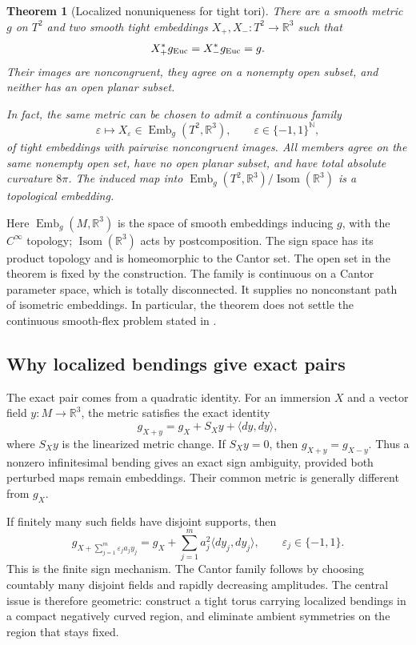 \documentclass[11pt]{amsart}
\newtheorem{theorem}{Theorem}[section]
\theoremstyle{definition}
\theoremstyle{remark}
\newcommand{\R}{\mathbb R}\newcommand{\Sph}{\mathbb S}
\DeclareMathOperator{\Isom}{Isom}\DeclareMathOperator{\Emb}{Emb}
\numberwithin{equation}{section}
\begin{document}
\begin{theorem}[Localized nonuniqueness for tight tori]\label{thm:main-fiber}
There are a smooth metric $g$ on $T^2$ and two smooth tight embeddings
$X_+,X_-:T^2\to\R^3$ such that
\[
 X_+^*g_{\rm Euc}=X_-^*g_{\rm Euc}=g.
\]
Their images are noncongruent, they agree on a nonempty open subset, and
neither has an open planar subset.

In fact, the same metric can be chosen to admit a continuous family
\[
 \varepsilon\longmapsto X_\varepsilon\in\Emb_g(T^2,\R^3),
 \qquad \varepsilon\in\{-1,1\}^{\mathbb N},
\]
of tight embeddings with pairwise noncongruent images. All members agree
on the same nonempty open set, have no open planar subset, and have total
absolute curvature $8\pi$. The induced map into
$\Emb_g(T^2,\R^3)/\Isom(\R^3)$ is a topological embedding.
\end{theorem}

Here $\Emb_g(M,\R^3)$ is the space of smooth embeddings inducing $g$, with
the $C^\infty$ topology; $\Isom(\R^3)$ acts by postcomposition. The sign
space has its product topology and is homeomorphic to the Cantor set.
The open set in the theorem is fixed by the construction. The family
is continuous on a Cantor parameter space, which is totally disconnected.
It supplies no nonconstant path of isometric embeddings. In particular,
the theorem does not settle the continuous smooth-flex problem stated
in \cite[Problem~1.1]{GhomiProblems}.

\subsection{Why localized bendings give exact pairs}
The exact pair comes from a quadratic identity. For an immersion $X$ and a vector
field $y:M\to\R^3$, the metric satisfies the exact identity
\begin{equation}\label{eq:intro-quadratic}
 g_{X+y}=g_X+S_Xy+\langle dy,dy\rangle,
\end{equation}
where $S_Xy$ is the linearized metric change. If $S_Xy=0$, then
$g_{X+y}=g_{X-y}$. Thus a nonzero infinitesimal bending gives an exact
sign ambiguity, provided both perturbed maps remain embeddings. Their
common metric is generally different from $g_X$.

If finitely many such fields have disjoint supports, then
\[
 g_{X+\sum_{j=1}^m\varepsilon_j a_jy_j}
 =g_X+\sum_{j=1}^m a_j^2\langle dy_j,dy_j\rangle,
 \qquad \varepsilon_j\in\{-1,1\}.
\]
This is the finite sign mechanism. The Cantor family follows by choosing
countably many disjoint fields and rapidly decreasing amplitudes. The
central issue is therefore geometric: construct a tight torus carrying
localized bendings in a compact negatively curved region, and eliminate
ambient symmetries on the region that stays fixed.
\end{document}
